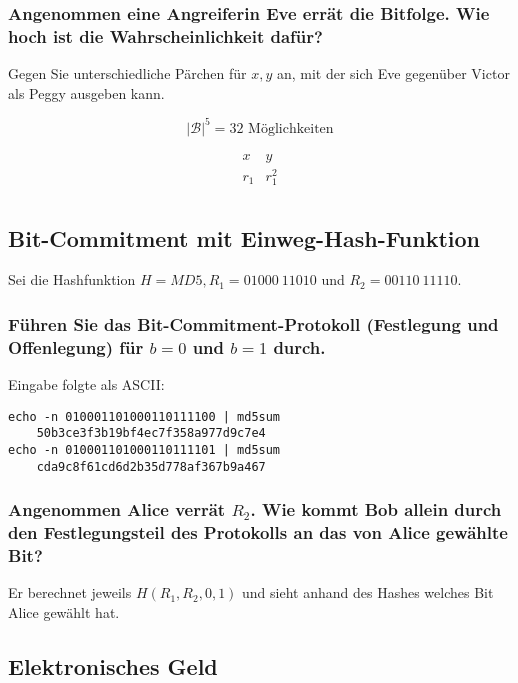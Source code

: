 \subsubsection{Angenommen eine Angreiferin Eve errät die Bitfolge. Wie hoch ist die Wahrscheinlichkeit dafür?} Gegen Sie unterschiedliche Pärchen für $x, y$ an, mit der sich Eve gegenüber Victor als Peggy ausgeben kann.

\begin{equation}
	|\mathcal{B}|^5 = 32 \text{ Möglichkeiten}
\end{equation}

\begin{equation}
	\begin{matrix}
				x & y        \\
				r_1 & r_1^2  \\				
	\end{matrix}
\end{equation}
	
\subsection{Bit-Commitment mit Einweg-Hash-Funktion}
Sei die Hashfunktion $H = MD5, R_1 = 01000~11010$ und $R_2 = 00110~11110$.
\subsubsection{Führen Sie das Bit-Commitment-Protokoll (Festlegung und Offenlegung) für $b=0$ und $b=1$ durch.}
Eingabe folgte als ASCII:

\begin{verbatim}
echo -n 010001101000110111100 | md5sum 
    50b3ce3f3b19bf4ec7f358a977d9c7e4 
echo -n 010001101000110111101 | md5sum 
    cda9c8f61cd6d2b35d778af367b9a467
\end{verbatim}

\subsubsection{Angenommen Alice verrät $R_2$. Wie kommt Bob allein durch den Festlegungsteil des Protokolls an das von Alice gewählte Bit?}

Er berechnet jeweils $H(R_1,R_2,{0,1})$ und sieht anhand des Hashes welches Bit Alice gewählt hat.

\subsection{Elektronisches Geld}
